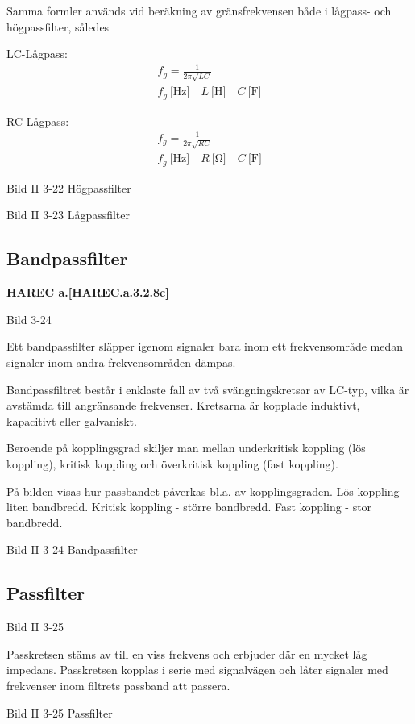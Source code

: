 Samma formler används vid beräkning av gränsfrekvensen både i lågpass- och
högpassfilter, således

LC-Lågpass:
\begin{gather*}
  f_g = \frac{1}{2π\sqrt{LC}} \\
  f_g\ \text{[Hz]} \quad L\ \text{[H]} \quad C\ \text{[F]}
\end{gather*}

RC-Lågpass:
\begin{gather*}
  f_g = \frac{1}{2π\sqrt{RC}} \\
  f_g\ \text{[Hz]} \quad R\ \text{[Ω]} \quad C\ \text{[F]}
\end{gather*}

Bild II 3-22 Högpassfilter

Bild II 3-23 Lågpassfilter

\subsection{Bandpassfilter}
\textbf{HAREC a.\ref{HAREC.a.3.2.8c}\label{myHAREC.a.3.2.8c}}

Bild 3-24

Ett bandpassfilter släpper igenom signaler bara inom ett frekvensområde medan
signaler inom andra frekvensområden dämpas.

Bandpassfiltret består i enklaste fall av två svängningskretsar av LC-typ, vilka
är avstämda till angränsande frekvenser. Kretsarna är kopplade induktivt,
kapacitivt eller galvaniskt.

Beroende på kopplingsgrad skiljer man mellan underkritisk koppling (lös
koppling), kritisk koppling och överkritisk koppling (fast koppling).

På bilden visas hur passbandet påverkas bl.a. av kopplingsgraden. Lös koppling
liten bandbredd. Kritisk koppling - större bandbredd. Fast koppling - stor
bandbredd.

Bild II 3-24 Bandpassfilter

\subsection{Passfilter}

Bild II 3-25

Passkretsen stäms av till en viss frekvens och erbjuder där en mycket låg
impedans. Passkretsen kopplas i serie med signalvägen och låter signaler med
frekvenser inom filtrets passband att passera.

Bild II 3-25 Passfilter


